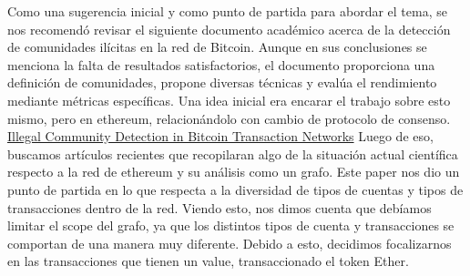 \documentclass{article}
\begin{document}
Como una sugerencia inicial y como punto de partida para abordar el tema, se nos recomendó revisar el siguiente documento académico acerca de la detección de comunidades ilícitas en la red de Bitcoin. Aunque en sus conclusiones se menciona la falta de resultados satisfactorios, el documento proporciona una definición de comunidades, propone diversas técnicas y evalúa el rendimiento mediante métricas específicas.
Una idea inicial era encarar el trabajo sobre esto mismo, pero en ethereum, relacionándolo con cambio de protocolo de consenso.
\newline
\href{https://www.mdpi.com/1099-4300/25/7/1069}{Illegal Community Detection in Bitcoin Transaction Networks}
Luego de eso, buscamos artículos recientes que recopilaran algo de la situación actual científica respecto a la red de ethereum y su análisis como un grafo. Este paper nos dio un punto de partida en lo que respecta a la diversidad de tipos de cuentas y tipos de transacciones dentro de la red. Viendo esto, nos dimos cuenta que debíamos limitar el scope del grafo, ya que los distintos tipos de cuenta y transacciones se comportan de una manera muy diferente. Debido a esto, decidimos focalizarnos en las transacciones que tienen un value, transaccionado el token Ether.




\end{document}
